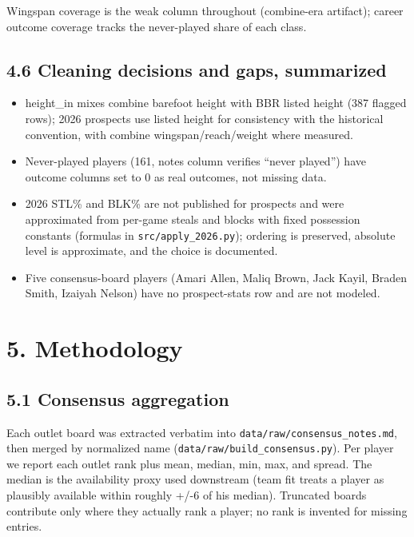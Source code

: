 \documentclass[
  10pt,
]{article}
\providecommand{\tightlist}{%
  \setlength{\itemsep}{0pt}\setlength{\parskip}{0pt}}
\begin{document}
Wingspan coverage is the weak column throughout (combine-era artifact); career
outcome coverage tracks the never-played share of each class.

\subsection{4.6 Cleaning decisions and gaps,
summarized}\label{cleaning-decisions-and-gaps-summarized}

\begin{itemize}
\tightlist
\item
  height\_in mixes combine barefoot height with BBR listed height (387 flagged
  rows); 2026 prospects use listed height for consistency with the historical
  convention, with combine wingspan/reach/weight where measured.
\item
  Never-played players (161, notes column verifies ``never played'') have
  outcome columns set to 0 as real outcomes, not missing data.
\item
  2026 STL\% and BLK\% are not published for prospects and were approximated
  from per-game steals and blocks with fixed possession constants (formulas in
  \texttt{src/apply\_2026.py}); ordering is preserved, absolute level is
  approximate, and the choice is documented.
\item
  Five consensus-board players (Amari Allen, Maliq Brown, Jack Kayil, Braden
  Smith, Izaiyah Nelson) have no prospect-stats row and are not modeled.
\end{itemize}

\section{5. Methodology}\label{methodology}

\subsection{5.1 Consensus aggregation}\label{consensus-aggregation}

Each outlet board was extracted verbatim into
\texttt{data/raw/consensus\_notes.md}, then merged by normalized name
(\texttt{data/raw/build\_consensus.py}). Per player we report each outlet rank
plus mean, median, min, max, and spread. The median is the availability proxy
used downstream (team fit treats a player as plausibly available within roughly
+/-6 of his median). Truncated boards contribute only where they actually rank a
player; no rank is invented for missing entries.
\end{document}
